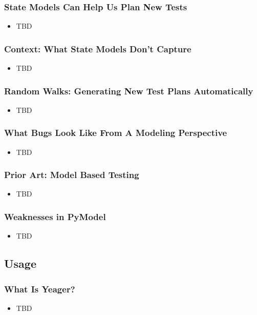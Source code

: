 \begin{frame}
  \frametitle{State Models Can Help Us Plan New Tests}
  \begin{itemize}
    \item TBD
  \end{itemize}
\end{frame}

\begin{frame}
  \frametitle{Context: What State Models Don't Capture}
  \begin{itemize}
    \item TBD
  \end{itemize}
\end{frame}

\begin{frame}
  \frametitle{Random Walks: Generating New Test Plans Automatically}
  \begin{itemize}
    \item TBD
  \end{itemize}
\end{frame}

\begin{frame}
  \frametitle{What Bugs Look Like From A Modeling Perspective}
  \begin{itemize}
    \item TBD
  \end{itemize}
\end{frame}

\begin{frame}
  \frametitle{Prior Art: Model Based Testing}
  \begin{itemize}
    \item TBD
  \end{itemize}
\end{frame}

\begin{frame}
  \frametitle{Weaknesses in PyModel}
  \begin{itemize}
    \item TBD
  \end{itemize}
\end{frame}

\subsection{Usage}

\begin{frame}
  \frametitle{What Is Yeager?}
  \begin{itemize}
    \item TBD
  \end{itemize}
\end{frame}

